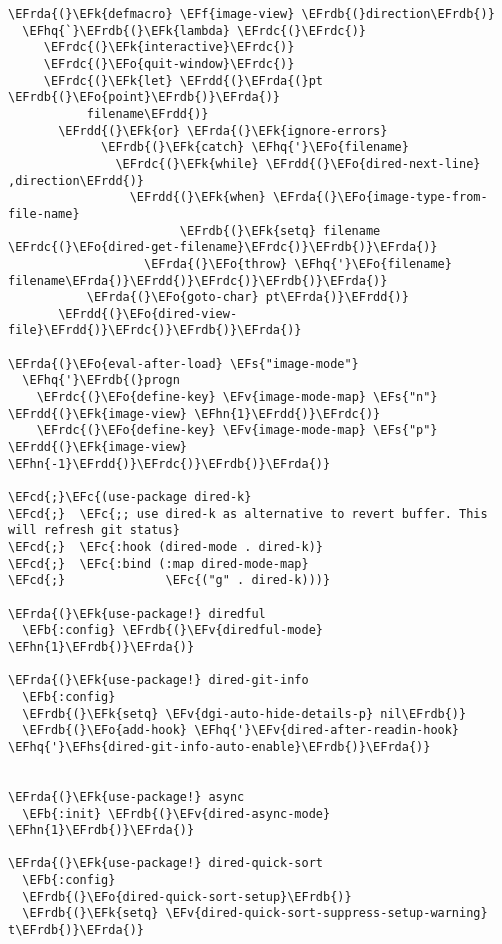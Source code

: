 \documentclass[a4wide,10pt]{article}
\newcommand{\EFc}[1]{\textcolor{EFc}{#1}} %
\newcommand{\EFcd}[1]{\textcolor{EFcd}{#1}} %
\newcommand{\EFs}[1]{\textcolor{EFs}{#1}} %
\newcommand{\EFk}[1]{\textcolor{EFk}{#1}} %
\newcommand{\EFb}[1]{\textcolor{EFb}{#1}} %
\newcommand{\EFf}[1]{\textcolor{EFf}{#1}} %
\newcommand{\EFv}[1]{\textcolor{EFv}{#1}} %
\newcommand{\EFo}[1]{\textcolor{EFo}{#1}} %
\newcommand{\EFhn}[1]{\textcolor{EFhn}{\textbf{#1}}} %
\newcommand{\EFhq}[1]{\textcolor{EFhq}{#1}} %
\newcommand{\EFhs}[1]{\textcolor{EFhs}{#1}} %
\newcommand{\EFrda}[1]{\textcolor{EFrda}{#1}} %
\newcommand{\EFrdb}[1]{\textcolor{EFrdb}{#1}} %
\newcommand{\EFrdc}[1]{\textcolor{EFrdc}{#1}} %
\newcommand{\EFrdd}[1]{\textcolor{EFrdd}{#1}} %
\begin{document}
\begin{Code}
\begin{Verbatim}
\EFrda{(}\EFk{defmacro} \EFf{image-view} \EFrdb{(}direction\EFrdb{)}
  \EFhq{`}\EFrdb{(}\EFk{lambda} \EFrdc{(}\EFrdc{)}
     \EFrdc{(}\EFk{interactive}\EFrdc{)}
     \EFrdc{(}\EFo{quit-window}\EFrdc{)}
     \EFrdc{(}\EFk{let} \EFrdd{(}\EFrda{(}pt \EFrdb{(}\EFo{point}\EFrdb{)}\EFrda{)}
           filename\EFrdd{)}
       \EFrdd{(}\EFk{or} \EFrda{(}\EFk{ignore-errors}
             \EFrdb{(}\EFk{catch} \EFhq{'}\EFo{filename}
               \EFrdc{(}\EFk{while} \EFrdd{(}\EFo{dired-next-line} ,direction\EFrdd{)}
                 \EFrdd{(}\EFk{when} \EFrda{(}\EFo{image-type-from-file-name}
                        \EFrdb{(}\EFk{setq} filename \EFrdc{(}\EFo{dired-get-filename}\EFrdc{)}\EFrdb{)}\EFrda{)}
                   \EFrda{(}\EFo{throw} \EFhq{'}\EFo{filename} filename\EFrda{)}\EFrdd{)}\EFrdc{)}\EFrdb{)}\EFrda{)}
           \EFrda{(}\EFo{goto-char} pt\EFrda{)}\EFrdd{)}
       \EFrdd{(}\EFo{dired-view-file}\EFrdd{)}\EFrdc{)}\EFrdb{)}\EFrda{)}

\EFrda{(}\EFo{eval-after-load} \EFs{"image-mode"}
  \EFhq{'}\EFrdb{(}progn
    \EFrdc{(}\EFo{define-key} \EFv{image-mode-map} \EFs{"n"} \EFrdd{(}\EFk{image-view} \EFhn{1}\EFrdd{)}\EFrdc{)}
    \EFrdc{(}\EFo{define-key} \EFv{image-mode-map} \EFs{"p"} \EFrdd{(}\EFk{image-view} \EFhn{-1}\EFrdd{)}\EFrdc{)}\EFrdb{)}\EFrda{)}

\EFcd{;}\EFc{(use-package dired-k}
\EFcd{;}  \EFc{;; use dired-k as alternative to revert buffer. This will refresh git status}
\EFcd{;}  \EFc{:hook (dired-mode . dired-k)}
\EFcd{;}  \EFc{:bind (:map dired-mode-map}
\EFcd{;}              \EFc{("g" . dired-k)))}

\EFrda{(}\EFk{use-package!} diredful
  \EFb{:config} \EFrdb{(}\EFv{diredful-mode} \EFhn{1}\EFrdb{)}\EFrda{)}

\EFrda{(}\EFk{use-package!} dired-git-info
  \EFb{:config}
  \EFrdb{(}\EFk{setq} \EFv{dgi-auto-hide-details-p} nil\EFrdb{)}
  \EFrdb{(}\EFo{add-hook} \EFhq{'}\EFv{dired-after-readin-hook} \EFhq{'}\EFhs{dired-git-info-auto-enable}\EFrdb{)}\EFrda{)}


\EFrda{(}\EFk{use-package!} async
  \EFb{:init} \EFrdb{(}\EFv{dired-async-mode} \EFhn{1}\EFrdb{)}\EFrda{)}

\EFrda{(}\EFk{use-package!} dired-quick-sort
  \EFb{:config}
  \EFrdb{(}\EFo{dired-quick-sort-setup}\EFrdb{)}
  \EFrdb{(}\EFk{setq} \EFv{dired-quick-sort-suppress-setup-warning} t\EFrdb{)}\EFrda{)}


\end{Verbatim}
\end{Code}
\end{document}
